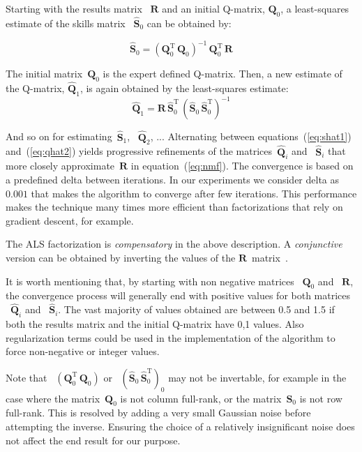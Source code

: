 Starting with the results matrix ~$\mathbf{R}$ and an initial Q-matrix, $\mathbf{Q}_0$, a least-squares estimate of the skills matrix ~$\mathbf{\hat{S}}_0$ can be obtained by:

\begin{equation}
    \mathbf{\hat{S}}_0 = (\mathbf{Q}_0^{\mathrm{T}}  \, \mathbf{Q}_0)^{-1} \, \mathbf{Q}_0^{\mathrm{T}} \, \mathbf{R} \label{eq:shat1}
\end{equation}


The initial matrix~$\mathbf{{Q}}_0$ is the expert defined Q-matrix. Then, a new estimate of the Q-matrix, $\mathbf{\hat{Q}}_1$, is again obtained by the least-squares estimate:
\begin{equation}
  \mathbf{\hat{Q}}_1 = \mathbf{R} \, \mathbf{\hat{S}}_0^{\mathrm{T}} \, (\mathbf{\hat{S}}_0 \, \mathbf{\hat{S}}_0^{\mathrm{T}})^{-1} \label{eq:qhat2}
\end{equation}

And so on for estimating~$\mathbf{\hat{S}}_1$, ~$\mathbf{\hat{Q}}_2$, ... Alternating between equations~(\ref{eq:shat1}) and~(\ref{eq:qhat2}) yields progressive refinements of the matrices~$\mathbf{\hat{Q}}_i$ and ~$\mathbf{\hat{S}}_i$ that more closely approximate~$\mathbf{R}$ in equation~(\ref{eq:nmf}).  The convergence is based on a predefined delta between iterations. In our experiments we consider delta as $0.001$ that makes the algorithm to converge after few iterations. This performance makes the technique many times more efficient than factorizations that rely on gradient descent, for example.

The ALS factorization is \textit{compensatory} in the above description.  A \textit{conjunctive} version can be obtained by inverting the values of the $\mathbf{R}$~matrix~\citep{Desmarais2012b}.  

It is worth mentioning that, by starting with non negative matrices ~$\mathbf{{Q}}_0$ and ~$\mathbf{R}$, the convergence process will generally end with positive values for both matrices ~$\mathbf{\hat{Q}}_i$ and ~$\mathbf{\hat{S}}_i$. The vast majority of values obtained are between 0.5 and 1.5 if both the results matrix and the initial Q-matrix have {0,1} values. Also regularization terms could be used in the implementation of the algorithm to force non-negative or integer values.

Note that ~$(\mathbf{Q}_0^{\mathrm{T}} \, \mathbf{Q}_0)$ or ~$(\mathbf{\hat{S}}_0 \,\mathbf{\hat{S}}_0^{\mathrm{T}})_0$ may not be invertable, for example in the case where the matrix~$\mathbf{Q}_0$ is not column full-rank, or the matrix~$\mathbf{S}_0$ is not row full-rank.  This is resolved by adding a very small Gaussian noise before attempting the inverse.  Ensuring the choice of a relatively insignificant noise does not affect the end result for our purpose. 



